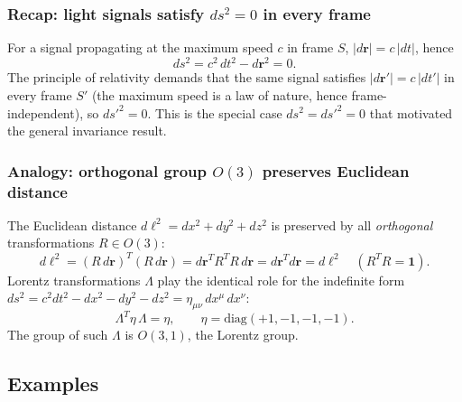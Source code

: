 \subsubsection*{Recap: light signals satisfy $ds^2 = 0$ in every frame}

For a signal propagating at the maximum speed $c$ in frame $S$,
$|d\mathbf{r}| = c\,|dt|$, hence
\begin{equation}
  ds^2 = c^2\,dt^2 - d\mathbf{r}^2 = 0.
  \label{eq:lec02:null-interval}
\end{equation}
The principle of relativity demands that the same signal satisfies
$|d\mathbf{r}'| = c\,|dt'|$ in every frame $S'$ (the maximum speed
is a law of nature, hence frame-independent), so $ds'^2 = 0$.  This
is the special case $ds^2 = ds'^2 = 0$ that motivated the general
invariance result.

\subsubsection*{Analogy: orthogonal group $O(3)$ preserves Euclidean
distance}

The Euclidean distance
$d\ell^2 = dx^2 + dy^2 + dz^2$
is preserved by all \emph{orthogonal} transformations $R \in O(3)$:
\begin{equation}
  d\ell^2 = (R\,d\mathbf{r})^T(R\,d\mathbf{r})
           = d\mathbf{r}^T R^T R\,d\mathbf{r}
           = d\mathbf{r}^T d\mathbf{r}
           = d\ell^2
  \quad (R^T R = \mathbf{1}).
  \label{eq:lec02:orthogonal-invariance}
\end{equation}
Lorentz transformations $\Lambda$ play the identical role for the
indefinite form
$ds^2 = c^2 dt^2 - dx^2 - dy^2 - dz^2 = \eta_{\mu\nu}\,dx^\mu\,dx^\nu$:
\begin{equation}
  \Lambda^T \eta\,\Lambda = \eta,
  \qquad
  \eta = \mathrm{diag}(+1,-1,-1,-1).
  \label{eq:lec02:lorentz-metric-condition}
\end{equation}
The group of such $\Lambda$ is $O(3,1)$, the Lorentz group.

\subsection*{Examples}

